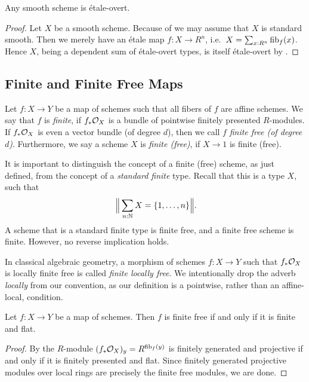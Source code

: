 \begin{corollary}
  \label{smooth-implies-etale-overt}
  Any smooth scheme is étale-overt.
\end{corollary}

\begin{proof}
  Let $X$ be a smooth scheme.
  Because of  we may assume that $X$ is standard smooth.
  Then we merely have an étale map $f : X \to R^n$, i.e.\ $X = \sum_{x:R^n} \mathrm{fib}_f(x)$.
  Hence $X$, being a dependent sum of étale-overt types, is itself étale-overt by .
\end{proof}




\subsection{Finite and Finite Free Maps}

\begin{definition}
  \label{def:finite-free-map}
  Let $f : X \to Y$ be a map of schemes such that all fibers of \(f\) are affine schemes.
  We say that $f$ is \emph{finite}, if $f_\ast\mathcal{O}_X$ is a bundle of pointwise finitely presented $R$-modules.
  If $f_\ast\mathcal{O}_X$ is even a vector bundle (of degree $d$), then we call $f$ \emph{finite free (of degree $d$)}.
  Furthermore, we say a scheme $X$ is \emph{finite (free)}, if $X \to 1$ is finite (free).
\end{definition}

It is important to distinguish the concept of a finite (free) scheme, as just defined, from the concept of a \emph{standard finite} type.
Recall that this is a type $X$, such that
\[
  \Big\| \sum_{n:\bN} X = \{1,\hdots,n\} \Big\| \rlap{.}
\]
A scheme that is a standard finite type is finite free, and a finite free scheme is finite.
However, no reverse implication holds.

In classical algebraic geometry, a morphism of schemes $f : X \to Y$ such that $f_\ast\mathcal{O}_X$ is locally finite free is called \emph{finite locally free}.
We intentionally drop the adverb \emph{locally} from our convention, as our definition is a pointwise, rather than an affine-local, condition.

\begin{lemma}
  Let $f : X \to Y$ be a map of schemes.
  Then $f$ is finite free if and only if it is finite and flat.
\end{lemma}

\begin{proof}
  By \cite[Theorem VIII-1.4]{lombardi-quitte} the $R$-module $(f_\ast \mathcal{O}_X)_y = R^{\mathrm{fib}_f(y)}$ is finitely generated and projective if and only if it is finitely presented and flat.
  Since finitely generated projective modules over local rings are precisely the finite free modules, we are done.
\end{proof}

